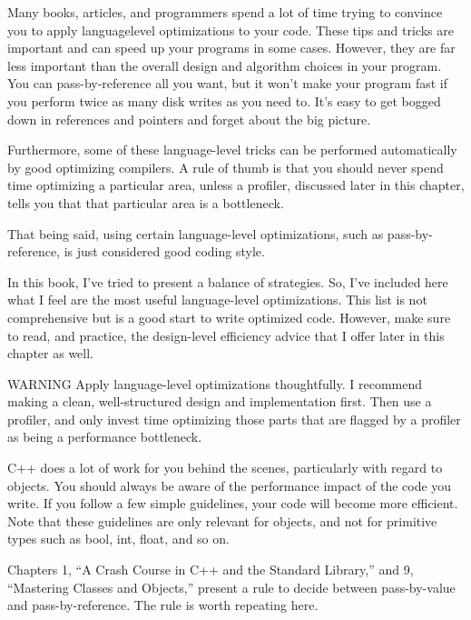 
Many books, articles, and programmers spend a lot of time trying to convince you to apply languagelevel optimizations to your code. These tips and tricks are important and can speed up your programs in some cases. However, they are far less important than the overall design and algorithm choices in your program. You can pass-by-reference all you want, but it won’t make your program fast if you perform twice as many disk writes as you need to. It’s easy to get bogged down in references and pointers and forget about the big picture.

Furthermore, some of these language-level tricks can be performed automatically by good optimizing compilers. A rule of thumb is that you should never spend time optimizing a particular area, unless a profiler, discussed later in this chapter, tells you that that particular area is a bottleneck.

That being said, using certain language-level optimizations, such as pass-by-reference, is just considered good coding style.

In this book, I’ve tried to present a balance of strategies. So, I’ve included here what I feel are the most useful language-level optimizations. This list is not comprehensive but is a good start to write optimized code. However, make sure to read, and practice, the design-level efficiency advice that I offer later in this chapter as well.

\begin{myWarning}{WARNING}
Apply language-level optimizations thoughtfully. I recommend making a clean, well-structured design and implementation first. Then use a profiler, and only invest time optimizing those parts that are flagged by a profiler as being a performance bottleneck.
\end{myWarning}


C++ does a lot of work for you behind the scenes, particularly with regard to objects. You should always be aware of the performance impact of the code you write. If you follow a few simple guidelines, your code will become more efficient. Note that these guidelines are only relevant for objects, and not for primitive types such as bool, int, float, and so on.


Chapters 1, “A Crash Course in C++ and the Standard Library,” and 9, “Mastering Classes and Objects,” present a rule to decide between pass-by-value and pass-by-reference. The rule is worth repeating here.

